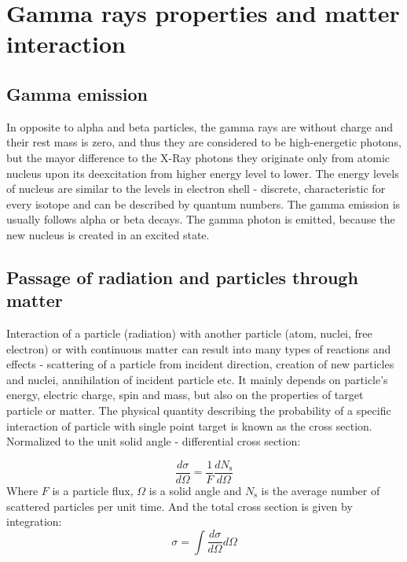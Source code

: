 
\chapter{Gamma rays properties and matter interaction}


\section{Gamma emission}
In opposite to alpha and beta particles, the gamma rays are without charge and their rest mass is zero, and thus they are considered to be high-energetic photons, but the mayor difference to the X-Ray photons they originate only from atomic nucleus upon its deexcitation from higher energy level to lower. The energy levels of nucleus are similar to the levels in electron shell - discrete, characteristic for every isotope and can be described by quantum numbers. The gamma emission is usually follows alpha or beta decays. The gamma photon is emitted, because the new nucleus is created in an excited state.


\section{Passage of radiation and particles through matter}
Interaction of a particle (radiation) with another particle (atom, nuclei, free electron) or with continuous matter can result into many types of reactions and effects - scattering of a particle from incident direction, creation of new particles and nuclei, annihilation of incident particle etc. It mainly depends on particle's energy, electric charge, spin and mass, but also on the properties of target particle or matter. The physical quantity describing the probability of a specific interaction of particle with single point target is known as the cross section. Normalized to the unit solid angle - differential cross section:



 \begin{equation}
\frac{d\sigma}{d\Omega} = \frac{1}{F} \frac{dN_\textrm{s}}{d\Omega}
 \end{equation}
Where $F$ is a particle flux, $\Omega$ is a solid angle and $N_\textrm{s}$ is the average number of scattered particles per unit time.
And the total cross section is given by integration:
  \begin{equation}
 \sigma = \int \frac{d\sigma}{d\Omega} d\Omega
 \end{equation}

